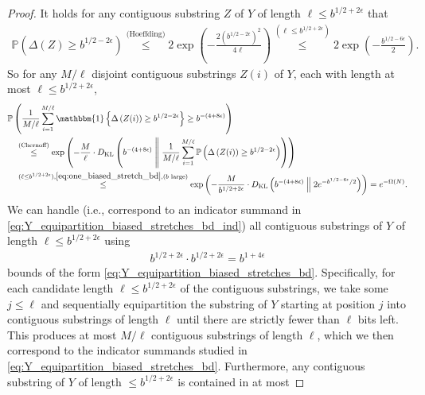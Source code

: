 \documentclass[11pt]{amsart}
\numberwithin{equation}{section}
\numberwithin{equation}{section}
\newcommand{\1}{\mathbbm{1}}
\newcommand{\KL}{D_{\mathrm{KL}}}
\newcommand{\Prob}{\mathbb{P}}
\newcommand{\doubleline}{\;\middle\|\;}
\theoremstyle{definition}
\begin{document}
\begin{proof}
    It holds for any contiguous substring $Z$ of $Y$ of length $\ell \leq b^{1/2+2\epsilon}$ that
    \begin{align} \label{eq:one_biased_stretch_bd}
        \Prob\left( \Delta(Z) \geq b^{1/2-2\epsilon} \right) \stackrel{\text{(Hoeffding)}}{\leq} 2\exp\left( - \frac{2\left( b^{1/2-2\epsilon} \right)^2}{4\ell} \right) \stackrel{(\ell \leq b^{1/2+2\epsilon})}{\leq} 2\exp\left( - \frac{b^{1/2-6\epsilon}}{2} \right).
    \end{align}
    So for any $M/\ell$ disjoint contiguous substrings $Z(i)$ of $Y$, each with length at most $\ell \leq b^{1/2+2\epsilon}$,
    \begin{align}
        & \Prob\left( \frac{1}{M/\ell} \sum_{i=1}^{M/\ell} \1\left\{ \Delta\left( Z(i) \right) \geq b^{1/2-2\epsilon} \right\} \geq b^{-(4+8\epsilon)} \right) \label{eq:Y_equipartition_biased_stretches_bd_ind} \\
        & \quad \stackrel{\text{(Chernoff)}}{\leq} \exp\left( -\frac{M}{\ell} \cdot \KL\left( b^{-(4+8\epsilon)} \doubleline \frac{1}{M/\ell} \sum_{i=1}^{M/\ell} \Prob\left( \Delta\left( Z(i) \right) \geq b^{1/2-2\epsilon} \right) \right) \right) \nonumber \\
        & \quad \stackrel{(\ell \leq b^{1/2+2\epsilon}), \eqref{eq:one_biased_stretch_bd},\text{($b$ large)}}{\leq} \exp\left( -\frac{M}{b^{1/2+2\epsilon}} \cdot  \KL\left( b^{-(4+8\epsilon)} \doubleline 2e^{-b^{1/2-6\epsilon}/2} \right) \right) = e^{-\Omega(N)}. \label{eq:Y_equipartition_biased_stretches_bd}
    \end{align}
    We can handle (i.e., correspond to an indicator summand in \eqref{eq:Y_equipartition_biased_stretches_bd_ind}) all contiguous substrings of $Y$ of length $\ell \leq b^{1/2+2\epsilon}$ using 
    \begin{align*}
        b^{1/2+2\epsilon} \cdot b^{1/2+2\epsilon} = b^{1+4\epsilon}
    \end{align*}
    bounds of the form \eqref{eq:Y_equipartition_biased_stretches_bd}. Specifically, for each candidate length $\ell \leq b^{1/2+2\epsilon}$ of the contiguous substrings, we take some $j \leq \ell$ and sequentially equipartition the substring of $Y$ starting at position $j$ into contiguous substrings of length $\ell$ until there are strictly fewer than $\ell$ bits left. This produces at most $M/\ell$ contiguous substrings of length $\ell$, which we then correspond to the indicator summands studied in \eqref{eq:Y_equipartition_biased_stretches_bd}. Furthermore, any contiguous substring of $Y$ of length $\leq b^{1/2+2\epsilon}$ is contained in at most 

\end{proof}
\end{document}
